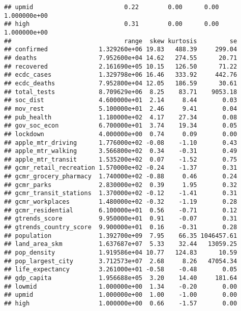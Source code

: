 \documentclass[]{article}
\newenvironment{Shaded}{\begin{snugshade}}{\end{snugshade}}
\newcommand{\KeywordTok}[1]{\textcolor[rgb]{0.13,0.29,0.53}{\textbf{#1}}}
\newcommand{\OperatorTok}[1]{\textcolor[rgb]{0.81,0.36,0.00}{\textbf{#1}}}
\newcommand{\NormalTok}[1]{#1}
\begin{document}
\begin{verbatim}
## upmid                         0.22        0.00      0.00 1.000000e+00
## high                          0.31        0.00      0.00 1.000000e+00
##                               range  skew kurtosis         se
## confirmed              1.329260e+06 19.83   488.39     299.04
## deaths                 7.952600e+04 14.62   274.55      20.71
## recovered              2.161690e+05 10.15   126.50      71.22
## ecdc_cases             1.329798e+06 16.46   333.92     442.76
## ecdc_deaths            7.952800e+04 12.05   186.59      30.61
## total_tests            8.709629e+06  8.25    83.71    9053.18
## soc_dist               4.600000e+01  2.14     8.44       0.03
## mov_rest               5.100000e+01  2.46     9.41       0.04
## pub_health             1.180000e+02  4.17    27.34       0.08
## gov_soc_econ           6.700000e+01  3.74    19.34       0.05
## lockdown               4.000000e+00  0.74     0.09       0.00
## apple_mtr_driving      1.776000e+02 -0.08    -1.10       0.43
## apple_mtr_walking      3.566800e+02  0.34    -0.31       0.49
## apple_mtr_transit      1.535200e+02  0.07    -1.52       0.75
## gcmr_retail_recreation 1.570000e+02 -0.24    -1.37       0.31
## gcmr_grocery_pharmacy  1.740000e+02 -0.88     0.46       0.24
## gcmr_parks             2.830000e+02  0.39     1.95       0.32
## gcmr_transit_stations  1.370000e+02 -0.12    -1.41       0.31
## gcmr_workplaces        1.480000e+02 -0.32    -1.19       0.28
## gcmr_residential       6.100000e+01  0.56    -0.71       0.12
## gtrends_score          9.950000e+01  0.91    -0.07       0.31
## gtrends_country_score  9.900000e+01  0.16    -0.31       0.28
## population             1.392700e+09  7.95    66.35 1046457.61
## land_area_skm          1.637687e+07  5.33    32.44   13059.25
## pop_density            1.919586e+04 10.77   124.83      10.59
## pop_largest_city       3.712573e+07  2.68     8.26   47054.34
## life_expectancy        3.261000e+01 -0.58    -0.48       0.05
## gdp_capita             1.956688e+05  3.20    14.40     181.64
## lowmid                 1.000000e+00  1.34    -0.20       0.00
## upmid                  1.000000e+00  1.00    -1.00       0.00
## high                   1.000000e+00  0.66    -1.57       0.00
\end{verbatim}

\begin{Shaded}
\end{Shaded}
\end{document}
